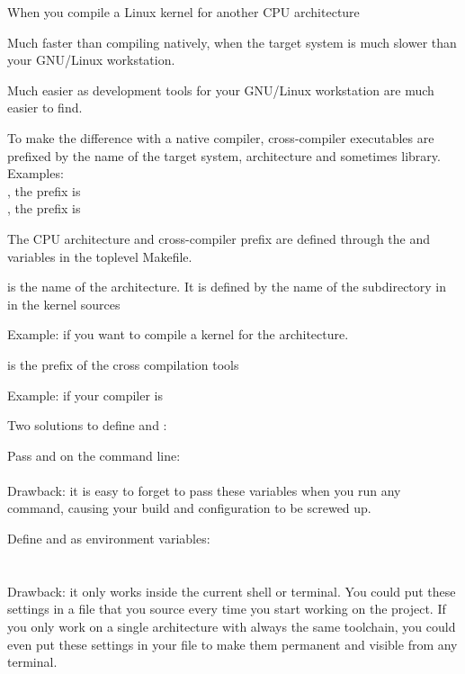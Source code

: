 
  When you compile a Linux kernel for another CPU architecture
  \startitemize
  \item Much faster than compiling natively, when the target system is
    much slower than your GNU/Linux workstation.
  \item Much easier as development tools for your GNU/Linux
    workstation are much easier to find.
  \item To make the difference with a native compiler, cross-compiler
    executables are prefixed by the name of the target system,
    architecture and sometimes
    library. Examples:\\
    , the prefix is \\
    , the prefix is 
  \stopitemize


  The CPU architecture and cross-compiler prefix are defined through
  the  and  variables in the toplevel
  Makefile.

  \startitemize
  \item {} is the name of the architecture. It is defined by
    the name of the subdirectory in  in the kernel sources
    \startitemize
    \item Example:  if you want to compile a kernel for
          the  architecture.
    \stopitemize
  \item {} is the prefix of the cross compilation
    tools
    \startitemize
    \item Example:  if your compiler is 
    \stopitemize
  \stopitemize


  Two solutions to define  and :

  \startitemize
  \item Pass  and  on the 
    command line: \\
     \\
    Drawback: it is easy to forget to pass these variables when
    you run any  command, causing your build and
    configuration to be screwed up.
  \item Define  and  as environment
    variables: \\
     \\
     \\
    Drawback: it only works inside the current
    shell or terminal. You could put these settings in a file
    that you source every time you start working on the project.
    If you only work on a single architecture with always the 
    same toolchain, you could even put these settings in your
     file to make them permanent and visible from
    any terminal.
  \stopitemize

